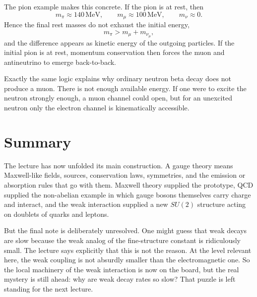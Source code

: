 The pion example makes this concrete. If the pion is at rest, then
\begin{equation}
m_\pi \approx 140\,\mathrm{MeV},
\qquad
m_\mu \approx 100\,\mathrm{MeV},
\qquad
m_\nu \approx 0.
\end{equation}
Hence the final rest masses do not exhaust the initial energy,
\begin{equation}
m_\pi > m_\mu + m_{\nu_\mu},
\end{equation}
and the difference appears as kinetic energy of the outgoing particles. If the initial pion is at rest, momentum conservation then forces the muon and antineutrino to emerge back-to-back.

Exactly the same logic explains why ordinary neutron beta decay does not produce a muon. There is not enough available energy. If one were to excite the neutron strongly enough, a muon channel could open, but for an unexcited neutron only the electron channel is kinematically accessible.

\section{Summary}

The lecture has now unfolded its main construction. A gauge theory means Maxwell-like fields, sources, conservation laws, symmetries, and the emission or absorption rules that go with them. Maxwell theory supplied the prototype, QCD supplied the non-abelian example in which gauge bosons themselves carry charge and interact, and the weak interaction supplied a new \(SU(2)\) structure acting on doublets of quarks and leptons.

But the final note is deliberately unresolved. One might guess that weak decays are slow because the weak analog of the fine-structure constant is ridiculously small. The lecture says explicitly that this is not the reason. At the level relevant here, the weak coupling is not absurdly smaller than the electromagnetic one. So the local machinery of the weak interaction is now on the board, but the real mystery is still ahead: why are weak decay rates so slow? That puzzle is left standing for the next lecture.